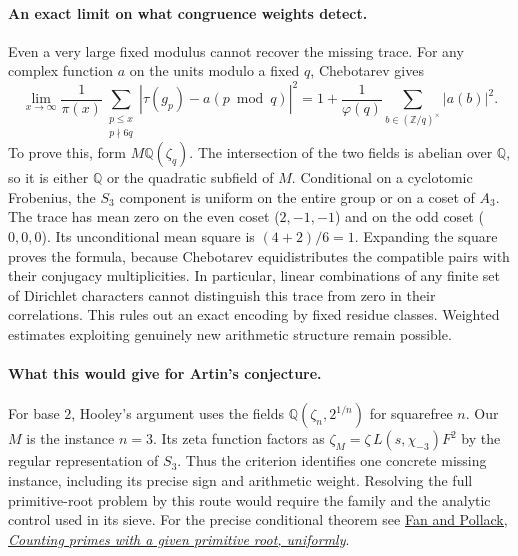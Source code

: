\paragraph{An exact limit on what congruence weights detect.}
Even a very large fixed modulus cannot recover the missing trace.
For any complex function $a$ on the units modulo a fixed $q$,
Chebotarev gives
\[
 \lim_{x\to\infty}\frac1{\pi(x)}
 \sum_{\substack{p\le x\\p\nmid 6q}} |\tau(g_p)-a(p\bmod q)|^2
   =1+\frac{1}{\varphi(q)}\sum_{b\in(\mathbb Z/q)^\times}|a(b)|^2 .
\]
To prove this, form $M\mathbb Q(\zeta_q)$. The intersection of the
two fields is abelian over $\mathbb Q$, so it is either $\mathbb Q$ or the
quadratic subfield of $M$. Conditional on a cyclotomic Frobenius, the
$S_3$ component is uniform on the entire group or on a coset of $A_3$.
The trace has mean zero on the even coset ($2,-1,-1$) and on the odd
coset ($0,0,0$). Its unconditional mean square is $(4+2)/6=1$.
Expanding the square proves the formula, because Chebotarev equidistributes
the compatible pairs with their conjugacy multiplicities.
In particular, linear combinations of any finite set of Dirichlet characters
cannot distinguish this trace from zero in their correlations.
This rules out an exact encoding by fixed residue classes. Weighted
estimates exploiting genuinely new arithmetic structure remain possible.

\paragraph{What this would give for Artin's conjecture.}
For base $2$, Hooley's argument uses the fields
$\mathbb Q(\zeta_n,2^{1/n})$ for squarefree $n$. Our $M$ is the instance
$n=3$. Its zeta function factors as
$\zeta_M=\zeta\,L(s,\chi_{-3})F^2$ by the regular representation of $S_3$.
Thus the criterion identifies one concrete missing instance, including
its precise sign and arithmetic weight. Resolving the full primitive-root
problem by this route would require the family and the analytic control
used in its sieve. For the precise conditional theorem see
\href{https://arxiv.org/abs/2505.05601}{Fan and Pollack, \emph{Counting primes with a given primitive root, uniformly}}.
